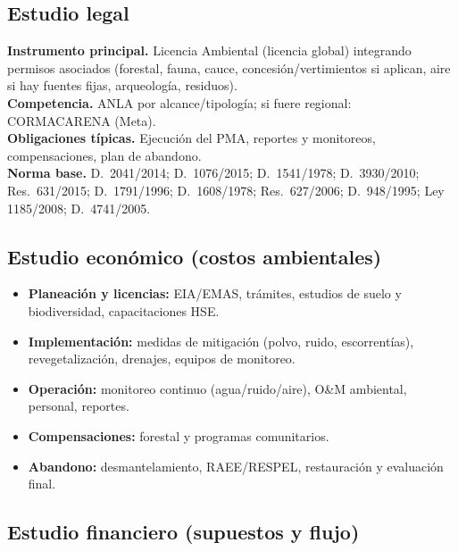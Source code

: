 \subsection{Estudio legal}
\textbf{Instrumento principal.} Licencia Ambiental (licencia global) integrando permisos asociados (forestal, fauna, cauce, concesión/vertimientos si aplican, aire si hay fuentes fijas, arqueología, residuos).\\
\textbf{Competencia.} ANLA por alcance/tipología; si fuere regional: CORMACARENA (Meta).\\
\textbf{Obligaciones típicas.} Ejecución del PMA, reportes y monitoreos, compensaciones, plan de abandono.\\
\textbf{Norma base.} D.\ 2041/2014; D.\ 1076/2015; D.\ 1541/1978; D.\ 3930/2010; Res.\ 631/2015; D.\ 1791/1996; D.\ 1608/1978; Res.\ 627/2006; D.\ 948/1995; Ley 1185/2008; D.\ 4741/2005.

\subsection{Estudio económico (costos ambientales)}
\begin{itemize}
\item \textbf{Planeación y licencias:} EIA/EMAS, trámites, estudios de suelo y biodiversidad, capacitaciones HSE.
\item \textbf{Implementación:} medidas de mitigación (polvo, ruido, escorrentías), revegetalización, drenajes, equipos de monitoreo.
\item \textbf{Operación:} monitoreo continuo (agua/ruido/aire), O\&M ambiental, personal, reportes.
\item \textbf{Compensaciones:} forestal y programas comunitarios.
\item \textbf{Abandono:} desmantelamiento, RAEE/RESPEL, restauración y evaluación final.
\end{itemize}

\subsection{Estudio financiero (supuestos y flujo)}
